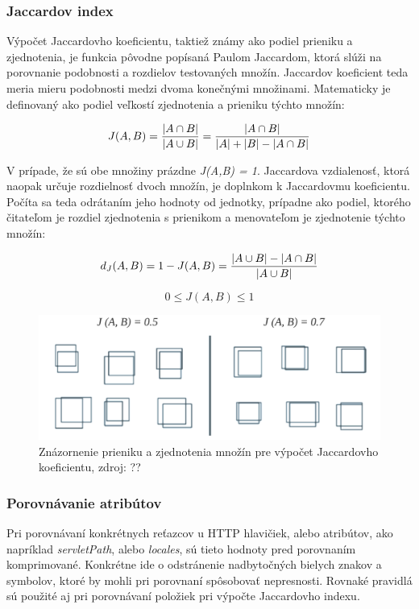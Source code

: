 \documentclass[
  digital, %
  table,   %
  lof,     %
  nolot,   %
  nocover
]{fithesis3}
\begin{document}
\subsubsection{Jaccardov index}
Výpočet Jaccardovho koeficientu, taktiež známy ako podiel prieniku a 
zjednotenia, je funkcia pôvodne popísaná Paulom Jaccardom, ktorá slúži na
porovnanie podobnosti a rozdielov testovaných množín. Jaccardov koeficient teda
meria mieru podobnosti medzi dvoma konečnými množinami. Matematicky je
definovaný ako podiel veľkostí zjednotenia a prieniku týchto množín:

\begin{equation}
 J(A,B) = {{|A \cap B|}\over{|A \cup B|}} = {{|A \cap B|}\over{|A| + |B| - |A \cap B|}}
\end{equation}

V prípade, že sú obe množiny prázdne \textit{J(A,B) = 1}.
Jaccardova vzdialenosť, ktorá naopak určuje rozdielnosť dvoch množín, je
doplnkom k Jaccardovmu koeficientu. Počíta sa teda odrátaním jeho hodnoty od
jednotky, prípadne ako podiel, ktorého čitateľom je rozdiel zjednotenia s
prienikom a menovateľom je zjednotenie týchto množín:

\begin{equation}
 d_J(A,B) = 1 - J(A,B) = { { |A \cup B| - |A \cap B| } \over |A \cup B| }
\end{equation}

\begin{equation}
 0\le J(A,B)\le 1
\end{equation}

\begin{figure}[h]
  \centering
    \includegraphics[width=.99\textwidth]{images/footprint-jacc-sets.png}
  \caption{Znázornenie prieniku a zjednotenia množín pre výpočet Jaccardovho
  koeficientu, zdroj: ??}
  \label{fig:footprint-jacc-sets}
\end{figure}

\subsubsection{Porovnávanie atribútov}
Pri porovnávaní konkrétnych reťazcov u HTTP hlavičiek, alebo atribútov, ako
napríklad \textit{servletPath}, alebo \textit{locales}, sú tieto hodnoty pred
porovnaním komprimované. Konkrétne ide o odstránenie nadbytočných bielych
znakov a symbolov, ktoré by mohli pri porovnaní spôsobovať nepresnosti. Rovnaké
pravidlá sú použité aj pri porovnávaní položiek pri výpočte Jaccardovho indexu.
\end{document}
